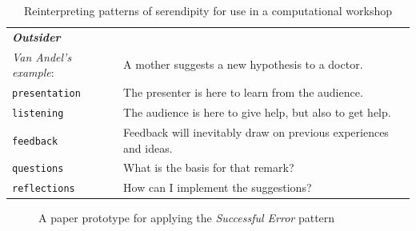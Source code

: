 \documentclass{llncs}
\begin{document}
\begin{table}[p]
\begin{tabular}{lp{}}
{\bf\emph{Outsider}} & \\
\emph{Van Andel's example}: & A mother suggests a new hypothesis to a doctor. \\[.2cm]
{\tt presentation}& The presenter is here to learn from the audience. \\
{\tt listening}   & The audience is here to give help, but also to get help.\\
{\tt feedback}    & Feedback will inevitably draw on previous experiences and ideas.\\
{\tt questions}   & What is the basis for that remark?\\
{\tt reflections} & How can I implement the suggestions?\\
\end{tabular}
\vspace{.2cm}
\caption{Reinterpreting patterns of serendipity for use in a computational workshop\label{tab:reinterpret}}
\end{table}

\begin{figure}[t]
\begin{center}
\end{center}
\caption{A paper prototype for applying the \emph{Successful Error} pattern\label{fig:paper-prototype}}
\end{figure}
\end{document}
